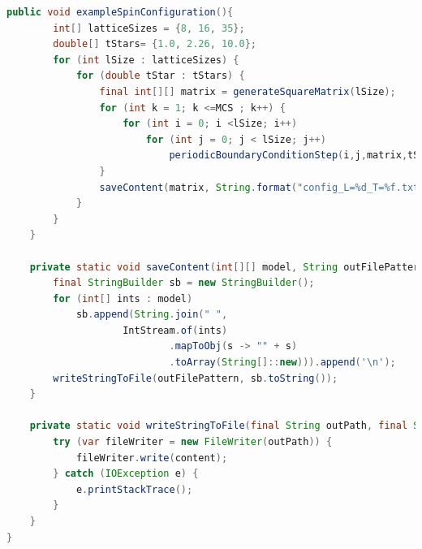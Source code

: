 \documentclass[11pt]{article}
\begin{document}
\begin{small}
\begin{lstlisting}[language=Java, frame=lines, numberstyle=\tiny, stepnumber=5,
            caption=Java Simulation Code \label{hibernate-properties}., firstnumber=1,label={lst:code}]
        public void exampleSpinConfiguration(){
        int[] latticeSizes = {8, 16, 35};
        double[] tStars= {1.0, 2.26, 10.0};
        for (int lSize : latticeSizes) {
            for (double tStar : tStars) {
                final int[][] matrix = generateSquareMatrix(lSize);
                for (int k = 1; k <=MCS ; k++) {
                    for (int i = 0; i <lSize; i++)
                        for (int j = 0; j < lSize; j++)
                            periodicBoundaryConditionStep(i,j,matrix,tStar);
                }
                saveContent(matrix, String.format("config_L=%d_T=%f.txt", lSize, tStar));
            }
        }
    }

    private static void saveContent(int[][] model, String outFilePattern) {
        final StringBuilder sb = new StringBuilder();
        for (int[] ints : model)
            sb.append(String.join(" ",
                    IntStream.of(ints)
                            .mapToObj(s -> "" + s)
                            .toArray(String[]::new))).append('\n');
        writeStringToFile(outFilePattern, sb.toString());
    }

    private static void writeStringToFile(final String outPath, final String content) {
        try (var fileWriter = new FileWriter(outPath)) {
            fileWriter.write(content);
        } catch (IOException e) {
            e.printStackTrace();
        }
    }
}

        \end{lstlisting}
    \end{small}
\end{document}
